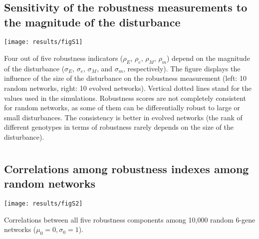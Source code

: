 \documentclass[10pt,a4paper]{article}
\newcommand{\earlyenv}{{\rho_E}}
\newcommand{\lateenv}{{\rho_e}}
\newcommand{\earlymut}{{\rho_M}}
\newcommand{\latemut}{{\rho_m}}
\begin{document}
\begin{appendices}
  \setcounter{section}{0}
  \renewcommand{\thesection}{\arabic{section}}

  \section{}
    \label{supp:sensitmag}
    \subsection*{Sensitivity of the robustness measurements to the magnitude of the disturbance}
	\begin{center}
	\texttt{[image: results/figS1]}
	\end{center}
	{\color{Gray} Four out of five robustness indicators ($\earlyenv$, $\lateenv$, $\earlymut$, $\latemut$) depend on the magnitude of the disturbance ($\sigma_E$, $\sigma_e$, $\sigma_M$, and $\sigma_m$, respectively). The figure displays the influence of the size of the disturbance on the robustness measurement (left: 10 random networks, right: 10 evolved networks). Vertical dotted lines stand for the values used in the simulations. Robustness scores are not completely consistent for random networks, as some of them can be differentially robust to large or small disturbances. The consistency is better in evolved networks (the rank of different genotypes in terms of robustness rarely depends on the size of the disturbance).  }


  \clearpage
  \section{}
    \label{supp:fullcorr}
    \subsection*{Correlations among robustness indexes among random networks}
	\begin{adjustwidth}{-1in}{0in}
	\begin{flushright}
	\texttt{[image: results/figS2]}
	\end{flushright}

	\color{Gray} Correlations between all five robustness components among 10,000 random 6-gene networks ($\mu_0=0, \sigma_0=1$). 
	\end{adjustwidth}


  \clearpage
  \section{}
    \label{supp:PC}

\end{appendices}
\end{document}
